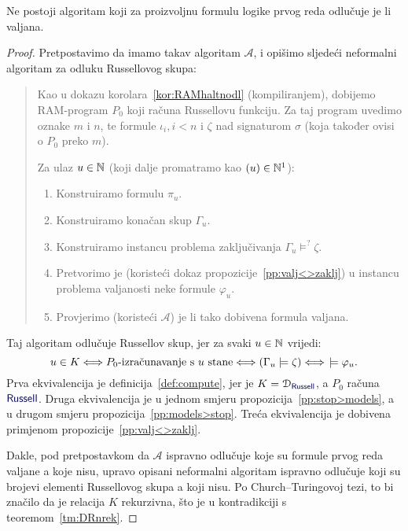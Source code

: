 \begin{teorem}[Church]\label{tm:Church}
Ne postoji algoritam koji za proizvoljnu formulu logike prvog reda odlučuje je li valjana.
\end{teorem}
\begin{proof}
Pretpostavimo da imamo takav algoritam $\mathcal A$, i opišimo sljedeći neformalni algoritam za odluku Russellovog skupa:
\begin{quote}
Kao u dokazu korolara~\ref{kor:RAMhaltnodl} (kompiliranjem), dobijemo RAM-program $P_0$ koji računa Russellovu funkciju. Za taj program uvedimo oznake $m$ i $n$, te formule $\iota_i,i<n$ i $\zeta$ nad signaturom $\sigma$ (koja također ovisi o $P_0$ preko $m$).

Za ulaz $u\in{\mathbb N}$ (koji dalje promatramo kao $(u)\in{\mathbb N}^1$):
\begin{enumerate}
    \item Konstruiramo formulu $\pi_u$.
    \item Konstruiramo konačan skup $\Gamma_u$.
    \item Konstruiramo instancu problema zaključivanja $\Gamma_u%
    \models^?
    \zeta$.
    \item\label{step:varphi_u} Pretvorimo je (koristeći dokaz propozicije~\ref{pp:valj<>zaklj}) u instancu problema valjanosti neke formule $\varphi_u$.
    \item Provjerimo (koristeći $\mathcal A$) je li tako dobivena formula valjana.
\end{enumerate}    
\end{quote}
Taj algoritam odlučuje Russellov skup, jer za svaki $u\in{\mathbb N}$ vrijedi:%
\begin{equation}\label{eq:lanaceqv}
    u\in K\Longleftrightarrow\text{$P_0$-izračunavanje s $u$ stane}\Longleftrightarrow(\Gamma_u\models\zeta)\Longleftrightarrow{}\!\models\varphi_u\text.
\end{equation}
Prva ekvivalencija je definicija~\ref{def:compute}, jer je $K=\dom{\f{Russell}}$, a $P_0$ računa $\f{Russell}$. Druga ekvivalencija je u jednom smjeru propozicija~\ref{pp:stop>models}, a u drugom smjeru propozicija~\ref{pp:models>stop}. Treća ekvivalencija je dobivena primjenom propozicije~\ref{pp:valj<>zaklj}.

Dakle, pod pretpostavkom da $\mathcal A$ ispravno odlučuje koje su formule prvog reda valjane a koje nisu, upravo opisani neformalni algoritam ispravno odlučuje koji su brojevi elementi Russellovog skupa a koji nisu. Po Church--\!Turingovoj tezi, to bi značilo da je relacija $K$ rekurzivna, što je u kontradikciji s teoremom~\ref{tm:DRnrek}.
\end{proof}

